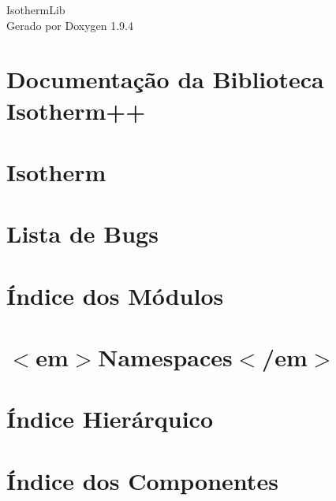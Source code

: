\documentclass[twoside]{book}
\newcommand{\+}{\discretionary{\mbox{\scriptsize$\hookleftarrow$}}{}{}}
\newcommand{\clearemptydoublepage}{%
    \newpage{\pagestyle{empty}\cleardoublepage}%
  }
\begin{document}
  \raggedbottom
    \hypersetup{pageanchor=false,
                bookmarksnumbered=true,
                pdfencoding=unicode
               }
  \begin{titlepage}
  \vspace*{7cm}
  \begin{center}%
  {\Large Isotherm\+Lib}\\
  \vspace*{1cm}
  {\large Gerado por Doxygen 1.9.4}\\
  \end{center}
  \end{titlepage}
  \clearemptydoublepage
  \tableofcontents
  \clearemptydoublepage
  \hypersetup{pageanchor=true}
\chapter{Documentação da Biblioteca Isotherm++}
\label{index}\hypertarget{index}{}
\chapter{Isotherm}
\label{md__d___documents__desennvolvimento__isotherm_lib__r_e_a_d_m_e}

\chapter{Lista de Bugs}
\label{bug}

\chapter{Índice dos Módulos}

\chapter{\texorpdfstring{$<$}{<}em\texorpdfstring{$>$}{>}Namespaces\texorpdfstring{$<$}{<}/em\texorpdfstring{$>$}{>}}

\chapter{Índice Hierárquico}

\chapter{Índice dos Componentes}

\end{document}
